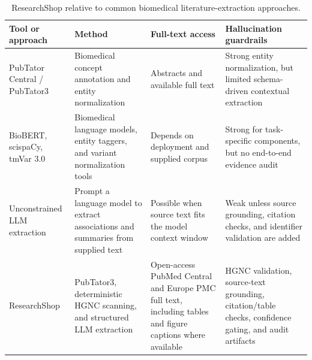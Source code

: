 \begin{table}[t]
\centering
\small
\setlength{\tabcolsep}{4pt}
\begin{tabularx}{\textwidth}{>{\raggedright\arraybackslash}p{2.8cm} >{\raggedright\arraybackslash}X >{\raggedright\arraybackslash}p{2.4cm} >{\raggedright\arraybackslash}X}
\toprule
\textbf{Tool or approach} & \textbf{Method} & \textbf{Full-text access} & \textbf{Hallucination guardrails} \\
\midrule
PubTator Central / PubTator3 & Biomedical concept annotation and entity normalization & Abstracts and available full text & Strong entity normalization, but limited schema-driven contextual extraction \\
BioBERT, scispaCy, tmVar 3.0 & Biomedical language models, entity taggers, and variant normalization tools & Depends on deployment and supplied corpus & Strong for task-specific components, but no end-to-end evidence audit \\
Unconstrained LLM extraction & Prompt a language model to extract associations and summaries from supplied text & Possible when source text fits the model context window & Weak unless source grounding, citation checks, and identifier validation are added \\
ResearchShop & PubTator3, deterministic HGNC scanning, and structured LLM extraction & Open-access PubMed Central and Europe PMC full text, including tables and figure captions where available & HGNC validation, source-text grounding, citation/table checks, confidence gating, and audit artifacts \\
\bottomrule
\end{tabularx}
\caption{ResearchShop relative to common biomedical literature-extraction approaches.}
\label{tab:tool_comparison}
\end{table}

